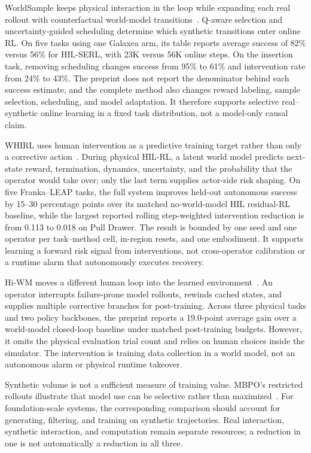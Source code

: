 WorldSample keeps physical interaction in the loop while expanding each real rollout with counterfactual world-model transitions~\cite{xue2026worldsample}. Q-aware selection and uncertainty-guided scheduling determine which synthetic transitions enter online RL. On five tasks using one Galaxea arm, its table reports average success of 82\% versus 56\% for HIL-SERL, with 23K versus 56K online steps. On the insertion task, removing scheduling changes success from 95\% to 61\% and intervention rate from 24\% to 43\%. The preprint does not report the denominator behind each success estimate, and the complete method also changes reward labeling, sample selection, scheduling, and model adaptation. It therefore supports selective real--synthetic online learning in a fixed task distribution, not a model-only causal claim.

WHIRL uses human intervention as a predictive training target rather than only a corrective action~\cite{yin2026whirl}. During physical HIL-RL, a latent world model predicts next-state reward, termination, dynamics, uncertainty, and the probability that the operator would take over; only the last term supplies actor-side risk shaping. On five Franka--LEAP tasks, the full system improves held-out autonomous success by 15--30 percentage points over its matched no-world-model HIL residual-RL baseline, while the largest reported rolling step-weighted intervention reduction is from 0.113 to 0.018 on Pull Drawer. The result is bounded by one seed and one operator per task--method cell, in-region resets, and one embodiment. It supports learning a forward risk signal from interventions, not cross-operator calibration or a runtime alarm that autonomously executes recovery.

Hi-WM moves a different human loop into the learned environment~\cite{li2026hiwm}. An operator interrupts failure-prone model rollouts, rewinds cached states, and supplies multiple corrective branches for post-training. Across three physical tasks and two policy backbones, the preprint reports a 19.0-point average gain over a world-model closed-loop baseline under matched post-training budgets. However, it omits the physical evaluation trial count and relies on human choices inside the simulator. The intervention is training data collection in a world model, not an autonomous alarm or physical runtime takeover.

Synthetic volume is not a sufficient measure of training value. MBPO's restricted rollouts illustrate that model use can be selective rather than maximized~\cite{janner2019mbpo}. For foundation-scale systems, the corresponding comparison should account for generating, filtering, and training on synthetic trajectories. Real interaction, synthetic interaction, and computation remain separate resources; a reduction in one is not automatically a reduction in all three.


